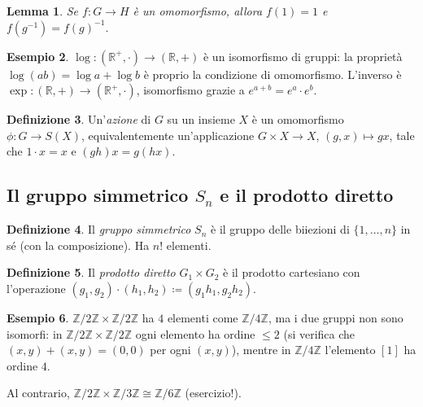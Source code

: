 \documentclass[11pt, a4paper]{book}
\theoremstyle{definition}
\newtheorem{definizione}{Definizione}[section]
\newtheorem{esempio}[definizione]{Esempio}
\theoremstyle{plain}
\newtheorem{lemma}[definizione]{Lemma}
\theoremstyle{remark}
\newcommand{\Z}{\mathbb{Z}}
\newcommand{\R}{\mathbb{R}}
\begin{document}
\begin{lemma}
Se $f \colon G \to H$ è un omomorfismo, allora $f(1) = 1$ e $f(g^{-1}) = f(g)^{-1}$.
\end{lemma}

\begin{exbox}
\begin{esempio}
$\log \colon (\R^+, \cdot) \to (\R, +)$ è un isomorfismo di gruppi: la proprietà $\log(ab) = \log a + \log b$ è proprio la condizione di omomorfismo. L'inverso è $\exp \colon (\R, +) \to (\R^+, \cdot)$, isomorfismo grazie a $e^{a+b} = e^a \cdot e^b$.
\end{esempio}
\end{exbox}

\begin{defbox}
\begin{definizione}
Un'\emph{azione} di $G$ su un insieme $X$ è un omomorfismo $\phi \colon G \to S(X)$, equivalentemente un'applicazione $G \times X \to X$, $(g,x) \mapsto gx$, tale che $1 \cdot x = x$ e $(gh)x = g(hx)$.
\end{definizione}
\end{defbox}

\subsection{Il gruppo simmetrico $S_n$ e il prodotto diretto}

\begin{defbox}
\begin{definizione}
Il \emph{gruppo simmetrico} $S_n$ è il gruppo delle biiezioni di $\{1, \ldots, n\}$ in sé (con la composizione). Ha $n!$ elementi.
\end{definizione}
\end{defbox}

\begin{defbox}
\begin{definizione}
Il \emph{prodotto diretto} $G_1 \times G_2$ è il prodotto cartesiano con l'operazione $(g_1, g_2) \cdot (h_1, h_2) \coloneqq (g_1 h_1, g_2 h_2)$.
\end{definizione}
\end{defbox}

\begin{exbox}
\begin{esempio}
$\Z/2\Z \times \Z/2\Z$ ha $4$ elementi come $\Z/4\Z$, ma i due gruppi non sono isomorfi: in $\Z/2\Z \times \Z/2\Z$ ogni elemento ha ordine $\leq 2$ (si verifica che $(x,y)+(x,y) = (0,0)$ per ogni $(x,y)$), mentre in $\Z/4\Z$ l'elemento $[1]$ ha ordine $4$.

Al contrario, $\Z/2\Z \times \Z/3\Z \cong \Z/6\Z$ (esercizio!).
\end{esempio}
\end{exbox}
\end{document}

